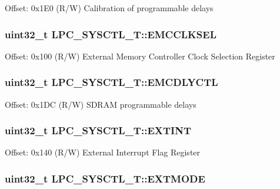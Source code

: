 Offset\-: 0x1\-E0 (R/\-W) Calibration of programmable delays \hypertarget{structLPC__SYSCTL__T_a23152315a7ac650737bf1b3852bab194}{
\subsubsection[{E\-M\-C\-C\-L\-K\-S\-E\-L}]{ uint32\-\_\-t L\-P\-C\-\_\-\-S\-Y\-S\-C\-T\-L\-\_\-\-T\-::\-E\-M\-C\-C\-L\-K\-S\-E\-L}}\label{structLPC__SYSCTL__T_a23152315a7ac650737bf1b3852bab194}
Offset\-: 0x100 (R/\-W) External Memory Controller Clock Selection Register \hypertarget{structLPC__SYSCTL__T_a3976afa12c3ebc2e7acfe59aef82acc4}{
\subsubsection[{E\-M\-C\-D\-L\-Y\-C\-T\-L}]{ uint32\-\_\-t L\-P\-C\-\_\-\-S\-Y\-S\-C\-T\-L\-\_\-\-T\-::\-E\-M\-C\-D\-L\-Y\-C\-T\-L}}\label{structLPC__SYSCTL__T_a3976afa12c3ebc2e7acfe59aef82acc4}
Offset\-: 0x1\-D\-C (R/\-W) S\-D\-R\-A\-M programmable delays \hypertarget{structLPC__SYSCTL__T_ac394af46f7dc8a036a574980c62ff769}{
\subsubsection[{E\-X\-T\-I\-N\-T}]{ uint32\-\_\-t L\-P\-C\-\_\-\-S\-Y\-S\-C\-T\-L\-\_\-\-T\-::\-E\-X\-T\-I\-N\-T}}\label{structLPC__SYSCTL__T_ac394af46f7dc8a036a574980c62ff769}
Offset\-: 0x140 (R/\-W) External Interrupt Flag Register \hypertarget{structLPC__SYSCTL__T_a22607cf2c4669efe70eae5746f74a33c}{
\subsubsection[{E\-X\-T\-M\-O\-D\-E}]{ uint32\-\_\-t L\-P\-C\-\_\-\-S\-Y\-S\-C\-T\-L\-\_\-\-T\-::\-E\-X\-T\-M\-O\-D\-E}}\label{structLPC__SYSCTL__T_a22607cf2c4669efe70eae5746f74a33c}
